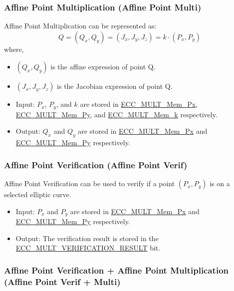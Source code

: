 \documentclass[main\_\_EN.tex]{subfiles}
\begin{document}
\subsubsection{Affine Point Multiplication (Affine Point Multi)}

Affine Point Multiplication can be represented as:
\[
Q = (Q_x,Q_y) = (J_x,J_y,J_z) = k \cdot (P_x,P_y)
\]
where,
\begin{itemize}
    \item $(Q_x,Q_y)$ is the affine expression of point Q.
    \item $(J_x,J_y,J_z)$ is the Jacobian expression of point Q.
    \item Input: $P_x$, $P_y$, and $k$  are stored in \hyperref[tab:ecc-memory]{ECC\_MULT\_Mem\_Px}, \hyperref[tab:ecc-memory]{ECC\_MULT\_Mem\_Py}, and \hyperref[tab:ecc-memory]{ECC\_MULT\_Mem\_k} respectively.
    \item Output: $Q_x$ and $Q_y$ are stored in \hyperref[tab:ecc-memory]{ECC\_MULT\_Mem\_Px} and \hyperref[tab:ecc-memory]{ECC\_MULT\_Mem\_Py} respectively.
\end{itemize}

\subsubsection{Affine Point Verification (Affine Point Verif)}

Affine Point Verification can be used to verify if a point  $(P_x,P_y)$ is on a selected elliptic curve.

\begin{itemize}
    \item Input: $P_x$ and $P_y$ are stored in \hyperref[tab:ecc-memory]{ECC\_MULT\_Mem\_Px} and \hyperref[tab:ecc-memory]{ECC\_MULT\_Mem\_Py} respectively.
    \item Output: The verification result is stored in the \hyperref[fielddesc:ECCMULTVERIFICATIONRESULT]{ECC\_MULT\_VERIFICATION\_RESULT} bit.
\end{itemize}

\subsubsection{Affine Point Verification + Affine Point Multiplication (Affine Point Verif + Multi)}
\end{document}
